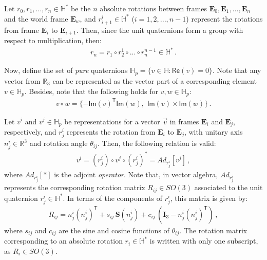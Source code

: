 Let $r_0, r_1, ... , r_n \in \mathbb{H}^*$ be the $n$ absolute rotations between frames $\mathbf{E}_0, \mathbf{E}_1, ..., \mathbf{E}_n$ and the world frame $\mathbf{E}_w$, and $r^i_{i+1} \in \mathbb{H}^*$ ($i=1,2,...,n-1$) represent the rotations from frame $\mathbf{E}_i$ to $\mathbf{E}_{i+1}$.
Then, since the unit quaternions form a group with respect to multiplication, then:
%
\begin{align}
r_n = r_1 \circ r^1_2 \circ ... \circ r^{n-1}_n \in \mathbb{H}^* \,.
\end{align}

Now, define the set of \textit{pure} quaternions $\mathbb{H}_p = \{ v \in \mathbb{H}: \mathsf{Re}(v) = 0 \}$.
%
Note that any vector from $\mathbb{R}_3$ can be represented as the vector part of a corresponding element $v \in \mathbb{H}_p$.
%
Besides, note that the following holds for $v,w \in \mathbb{H}_p$:
\begin{align}
%
v \circ w = \{ -\mathsf{Im}(v)^\mathsf{T} \mathsf{Im}(w) ,\,\, \mathsf{Im}(v) \times \mathsf{Im}(w) \} \,.
%
\end{align}
%

Let $v^i$ and $v^j \!\in\! \mathbb{H}_p$ be representations for a vector $\vec{v}$ in frames $\mathbf{E}_i$ and $\mathbf{E}_j$, respectively, and $r^i_j$ represents the rotation from $\mathbf{E}_i$ to $\mathbf{E}_j$, with unitary axis $n^i_{j} \in \mathbb{R}^3$ and rotation angle $\theta_{ij}$.
%
Then, the following relation is valid:
%
\begin{align}
v^i = (r^i_j) \circ v^j \circ (r^i_j)^* = Ad_{r^i_j} \left[ v^j \right] \,,
\end{align}
%
where $Ad_{r^i_j}[*]$ is the adjoint {\it operator}.
%
Note that, in vector algebra, $Ad_{r^i_j}$ represents the corresponding rotation matrix $R_{ij} \in SO(3)$ associated to the unit quaternion $r^i_j \in \mathbb{H}^*$.
%
In terms of the components of $r^i_j$, this matrix is given by:
%
\begin{align}
R_{ij} = n^i_{j} (n^i_{j})^\mathsf{T} + s_{ij} \, \mathbf{S}(n^i_{j}) + c_{ij} \, (\mathbf{I}_3 - n^i_{j} (n^i_{j})^\mathsf{T}) \,,
\label{eq:quaternion_rotation_matrix}
\end{align}
%
where $s_{ij}$ and $c_{ij}$ are the sine and cosine functions of $\theta_{ij}$.
The rotation matrix corresponding to an absolute rotation $r_i \in \mathbb{H}^*$ is written with only one subscript, as $R_i \in SO(3)$.

